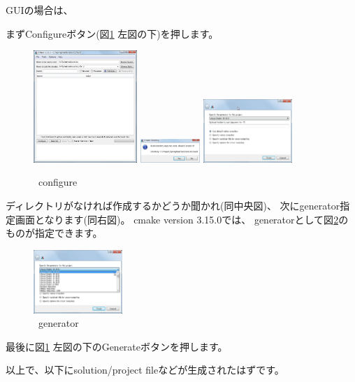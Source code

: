 \medskip
\noindent
GUI\KLUDGE の場合は、
\begin{narrow}[15pt]
	\KLUDGE まずConfigure\KLUDGE ボタン(\KLUDGE 図\ref{fig:CmakeConfigure} \KLUDGE 左図の下)\KLUDGE を押します。
	\begin{figure}[h]
	\begin{center}
	\includegraphics[width=0.35\textwidth]{fig/CmakeConfigure1.eps}
	\includegraphics[width=0.2\textwidth]{fig/CmakeConfigure2.eps}
	\includegraphics[width=0.3\textwidth]{fig/CmakeConfigure3.eps}
	\end{center}
	\caption{\cmake\ configure}
	\label{fig:CmakeConfigure}
	\end{figure}

	\build \KLUDGE ディレクトリがなければ作成するかどうか聞かれ(\KLUDGE 同中央図)\KLUDGE 、
	\KLUDGE 次にgenerator\KLUDGE 指定画面となります(\KLUDGE 同右図)\KLUDGE 。
	cmake version 3.15.0\KLUDGE では、
	generator\KLUDGE として図\ref{fig:CmakeGenerator}\KLUDGE のものが指定できます。

	\begin{figure}[h]
	\begin{center}
	\includegraphics[width=0.3\textwidth]{fig/CmakeConfigure4.eps}
	\end{center}
	\caption{\cmake\ generator}
	\label{fig:CmakeGenerator}
	\end{figure}

	\KLUDGE 最後に図\ref{fig:CmakeConfigure} \KLUDGE 左図の下のGenerate\KLUDGE ボタンを押します。
\end{narrow}

\medskip
\noindent
\KLUDGE 以上で、\build \KLUDGE 以下にsolution/project file\KLUDGE などが生成されたはずです。

\bigskip

